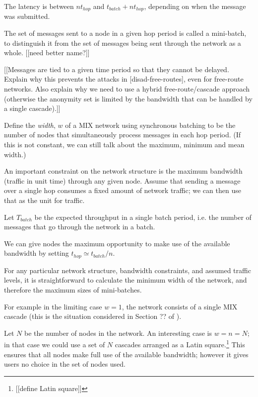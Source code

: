 \documentclass{llncs}
\begin{document}
The latency is between $nt_{hop}$ and $t_{batch} + nt_{hop}$, depending
on when the message was submitted.

The set of messages sent to a node in a given hop period is called a
mini-batch, to distinguish it from the set of messages being sent
through the network as a whole. [[need better name?]]

[[Messages are tied to a given time period so that they cannot be delayed.
Explain why this prevents the attacks in [disad-free-routes], even
for free-route networks. Also explain why we need to use a hybrid
free-route/cascade approach (otherwise the anonymity set is limited by
the bandwidth that can be handled by a single cascade).]]

Define the {\em width}, $w$ of a MIX network using synchronous batching to
be the number of nodes that simultaneously process messages in each
hop period. (If this is not constant, we can still talk about the
maximum, minimum and mean width.)

An important constraint on the network structure is the maximum
bandwidth (traffic in unit time) through any given node.
Assume that sending a message over a single hop consumes a fixed
amount of network traffic; we can then use that as the unit for
traffic.

Let $T_{batch}$ be the expected throughput in a single batch period,
i.e. the number of messages that go through the network in a batch.

We can give nodes the maximum opportunity to make use of the available
bandwidth by setting $t_{hop} \simeq t_{batch}/n$.


For any particular network structure, bandwidth constraints, and
assumed traffic levels, it is straightforward to calculate the
minimum width of the network, and therefore the maximum sizes of
mini-batches.

For example in the limiting case $w = 1$, the network consists of a
single MIX cascade (this is the situation considered in Section ??
of \cite{babel}).

Let $N$ be the number of nodes in the network. An interesting case
is $w = n = N$; in that case we could use a set of $N$ cascades
arranged as a Latin square.\footnote{[[define Latin square]]}
This ensures that all nodes make full use of the available bandwidth;
however it gives users no choice in the set of nodes used.
\end{document}
